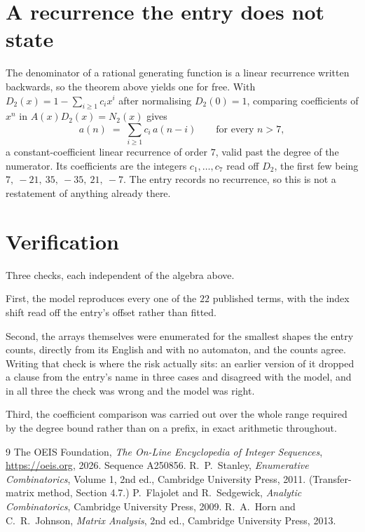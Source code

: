 \documentclass[11pt,a4paper]{article}
\theoremstyle{plain}
\theoremstyle{definition}
\begin{document}
\section{A recurrence the entry does not state}

The denominator of a rational generating function is a linear recurrence written backwards, so
the theorem above yields one for free. With $D_2(x)=1-\sum_{i\ge1}c_ix^i$ after normalising
$D_2(0)=1$, comparing coefficients of $x^n$ in $A(x)D_2(x)=N_2(x)$ gives
\[
a(n)\;=\;\sum_{i\ge1}c_i\,a(n-i)\qquad\text{for every }n>7,
\]
a constant-coefficient linear recurrence of order $7$, valid past the degree of the
numerator. Its coefficients are the integers $c_1,\dots,c_{7}$ read off $D_2$, the first few being $7,\ -21,\ 35,\ -35,\ 21,\ -7$. The entry records no recurrence, so this is not a restatement of anything
already there.

\section{Verification}

Three checks, each independent of the algebra above.

First, the model reproduces every one of the $22$ published terms, with the index shift
read off the entry's offset rather than fitted.

Second, the arrays themselves were enumerated for the smallest shapes the entry counts,
directly from its English and with no automaton, and the counts agree. Writing that check is
where the risk actually sits: an earlier version of it dropped a clause from the entry's name
in three cases and disagreed with the model, and in all three the check was wrong and the model
was right.

Third, the coefficient comparison was carried out over the whole range required by the degree
bound rather than on a prefix, in exact arithmetic throughout.

\begin{thebibliography}{9}
 The OEIS Foundation, \emph{The On-Line Encyclopedia of Integer
Sequences}, \url{https://oeis.org}, 2026. Sequence A250856.
 R.~P.~Stanley, \emph{Enumerative Combinatorics}, Volume 1, 2nd ed.,
Cambridge University Press, 2011. (Transfer-matrix method, Section 4.7.)
 P.~Flajolet and R.~Sedgewick, \emph{Analytic Combinatorics}, Cambridge
University Press, 2009.
 R.~A.~Horn and C.~R.~Johnson, \emph{Matrix Analysis}, 2nd ed., Cambridge
University Press, 2013.
\end{thebibliography}
\end{document}
